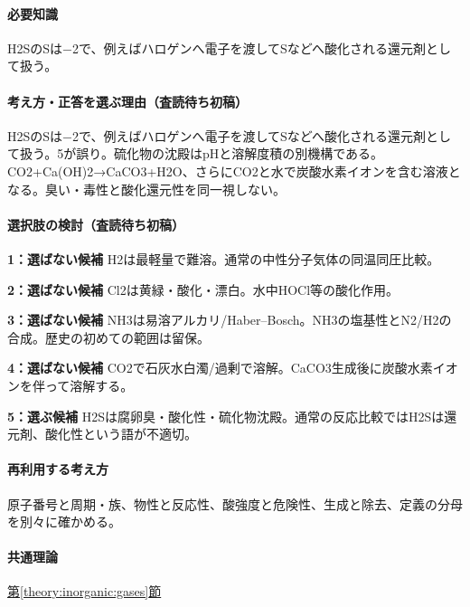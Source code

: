 \paragraph{必要知識} H2SのSは−2で、例えばハロゲンへ電子を渡してSなどへ酸化される還元剤として扱う。

\paragraph{考え方・正答を選ぶ理由（査読待ち初稿）} H2SのSは−2で、例えばハロゲンへ電子を渡してSなどへ酸化される還元剤として扱う。5が誤り。硫化物の沈殿はpHと溶解度積の別機構である。CO2+Ca(OH)2→CaCO3+H2O、さらにCO2と水で炭酸水素イオンを含む溶液となる。臭い・毒性と酸化還元性を同一視しない。

\paragraph{選択肢の検討（査読待ち初稿）}\mbox{}\par

\noindent\textbf{1：選ばない候補} H2は最軽量で難溶。通常の中性分子気体の同温同圧比較。\par

\noindent\textbf{2：選ばない候補} Cl2は黄緑・酸化・漂白。水中HOCl等の酸化作用。\par

\noindent\textbf{3：選ばない候補} NH3は易溶アルカリ/Haber–Bosch。NH3の塩基性とN2/H2の合成。歴史の初めての範囲は留保。\par

\noindent\textbf{4：選ばない候補} CO2で石灰水白濁/過剰で溶解。CaCO3生成後に炭酸水素イオンを伴って溶解する。\par

\noindent\textbf{5：選ぶ候補} H2Sは腐卵臭・酸化性・硫化物沈殿。通常の反応比較ではH2Sは還元剤、酸化性という語が不適切。\par

\paragraph{再利用する考え方} 原子番号と周期・族、物性と反応性、酸強度と危険性、生成と除去、定義の分母を別々に確かめる。

\paragraph{共通理論} \hyperref[theory:inorganic:gases]{第\ref*{theory:inorganic:gases}節}

